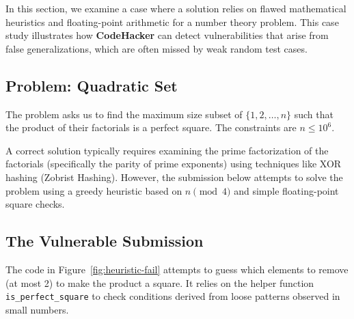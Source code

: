 \documentclass[11pt]{article}
\begin{document}
In this section, we examine a case where a solution relies on flawed mathematical heuristics and floating-point arithmetic for a number theory problem. This case study illustrates how \textbf{CodeHacker} can detect vulnerabilities that arise from false generalizations, which are often missed by weak random test cases.

\subsection{Problem: Quadratic Set}
The problem asks us to find the maximum size subset of $\{1, 2, \dots, n\}$ such that the product of their factorials is a perfect square. The constraints are $n \le 10^6$.

A correct solution typically requires examining the prime factorization of the factorials (specifically the parity of prime exponents) using techniques like XOR hashing (Zobrist Hashing). However, the submission below attempts to solve the problem using a greedy heuristic based on $n \pmod 4$ and simple floating-point square checks.

\subsection{The Vulnerable Submission}
The code in Figure~\ref{fig:heuristic-fail} attempts to guess which elements to remove (at most 2) to make the product a square. It relies on the helper function \texttt{is\_perfect\_square} to check conditions derived from loose patterns observed in small numbers.
\end{document}

